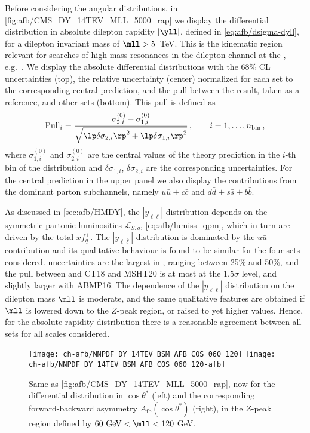 Before considering the angular distributions, in
\cref{fig:afb/CMS_DY_14TEV_MLL_5000_rap} we display the 
differential distribution in absolute dilepton rapidity $|\yll|$,
defined in \cref{eq:afb/dsigma-dyll},
for a dilepton invariant mass of $\mll > 5$~TeV.
%
This is the kinematic region relevant for searches of high-mass resonances
in the dilepton channel at the \lhc, e.g.~\cite{ATLAS:2019erb,Khachatryan:2016zqb}.
%
We display the absolute differential distributions with the 68\% CL \pdf uncertainties
(top), the relative \pdf uncertainty (center) normalized for each \pdf
set to the corresponding central prediction, and the pull between the
 result, taken as a reference, and other sets (bottom).
%
This pull is    defined as
    \begin{equation}
\label{eq:afb/pulldef_xsec}
{\text{Pull}}_i= \frac{ \sigma^{(0)}_{2,i} -\sigma^{(0)}_{1,i} }{
  \sqrt{ \lp  \delta \sigma_{2,i}\rp^2+\lp  \delta \sigma_{1,i}\rp^2 }} \, , \qquad i=1,\ldots,n_{\text{bin}} \, ,
\end{equation}
where  $\sigma^{(0)}_{1,i}$ and $\sigma^{(0)}_{2,i}$ are the central values of the
theory prediction in the $i$-th bin of the distribution and $\delta \sigma_{1,i}$, $\delta \sigma_{2,i}$ are
the corresponding \pdf uncertainties.
%
For the central  prediction in the upper panel we also display the
contributions from the dominant parton subchannels, namely
$u\bar{u}+c\bar{c}$ and $d\bar{d}+s\bar{s}+b\bar{b}$.

As discussed in \cref{sec:afb/HMDY}, the  $|y_{\ell\bar{\ell}}|$  distribution
depends  on the symmetric partonic luminosities $\mathcal{L}_{S,q}$, \cref{eq:afb/lumiss_qpm},
which in turn are driven by the total \pdfs $xf^+_q$.
%
The $|y_{\ell\bar{\ell}}|$  distribution
is dominated by the $u\bar{u}$
contribution and its qualitative behaviour is found to be similar for the four \pdf sets considered.
%
\pdf uncertainties are the largest in , ranging between 25\% and 50\%,
and the pull between  and  CT18 and MSHT20 is at most at the
$1.5\sigma$ level, and slightly larger  
with ABMP16.
%
The dependence of the $|y_{\ell\bar{\ell}}|$  distribution on the dilepton mass $\mll$
is moderate, and the same qualitative features are
obtained if $\mll$ is lowered down to the $Z$-peak region, or
raised to yet higher values.
%
Hence, for the absolute rapidity distribution there is a
reasonable agreement between all  \pdf sets for all scales considered.

\begin{figure}[t]
\centering
\texttt{[image: ch-afb/NNPDF\_DY\_14TEV\_BSM\_AFB\_COS\_060\_120]}
\texttt{[image: ch-afb/NNPDF\_DY\_14TEV\_BSM\_AFB\_COS\_060\_120-afb]}
\caption{Same as \cref{fig:afb/CMS_DY_14TEV_MLL_5000_rap}, now for the differential distribution in
  $\cos\theta^*$ (left)
  and the corresponding forward-backward asymmetry
  $A_{\text{fb}}(\cos\theta^*)$ (right), in the $Z$-peak region defined by $60~{\text{GeV}} < \mll < 120$ GeV.}
\label{fig:afb/CMS_DY_14TEV_MLL_zpeak}
\end{figure}

